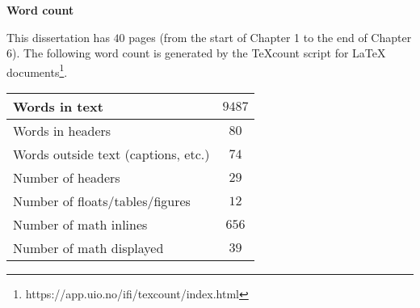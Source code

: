 \newpage
{\Huge \bf Word count}
\vspace{24pt}

\onehalfspacing
\large
This dissertation has $40$ pages (from the start of Chapter 1 to the end of Chapter 6). The following word count is generated by the TeXcount script for LaTeX documents\footnote{https://app.uio.no/ifi/texcount/index.html}.
\normalsize

\vspace{1.5cm}

\begin{center}
\large
\begin{tabular}{| l | c |}
\hline
Words in text & $9487$\\ \hline
Words in headers & $80$\\ \hline
Words outside text (captions, etc.) & $74$\\ \hline
Number of headers & $29$\\ \hline
Number of floats/tables/figures & $12$\\ \hline
Number of math inlines & $656$\\ \hline
Number of math displayed & $39$\\ 
\hline
\end{tabular}
\end{center}

\newpage